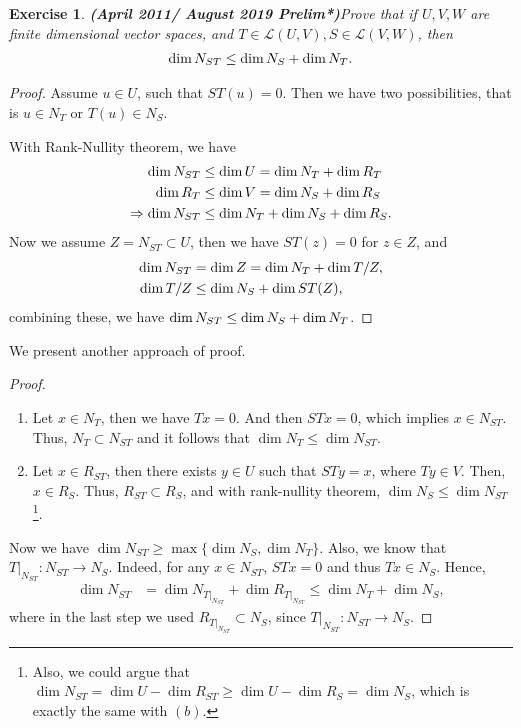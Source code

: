 \documentclass[11pt]{book}
\newtheorem{exercise}{Exercise}[section]
\theoremstyle{definition}
\numberwithin{equation}{subsection}
\begin{document}
\medskip

\begin{exercise}{\bf (April 2011/ August 2019 Prelim*)}\label{April_2011_p1}
Prove that if $U,V,W$ are finite dimensional vector spaces, and $T\in\mathscr{L}(U,V), S\in\mathscr{L}(V,W)$, then
\begin{align*}
    {\rm dim}\, N_{ST} \leq {\rm dim}\, N_S + {\rm dim}\, N_T.
\end{align*}
\end{exercise}
\begin{proof}
Assume $u\in U$, such that $ST(u) = 0$. Then we have two possibilities, that is $u\in N_T$ or $T(u)\in N_S$.

With Rank-Nullity theorem, we have 
\begin{align*}
    {\rm dim}\, N_{ST} & \leq {\rm dim}\, U = {\rm dim}\, N_T + {\rm dim}\, R_T \\
    {\rm dim}\, R_T & \leq {\rm dim}\, V = {\rm dim}\, N_S + {\rm dim}\, R_S\\
    \Rightarrow {\rm dim}\, N_{ST} & \leq {\rm dim}\, N_T + {\rm dim}\, N_S + {\rm dim}\, R_S.
\end{align*}
Now we assume $Z = N_{ST}\subset U$, then we have $ST(z) = 0$  for $z\in Z$, and 
\begin{align*}
    {\rm dim}\, N_{ST} & = {\rm dim}\, Z = {\rm dim}\, N_T + {\rm dim}\, T/Z, \\
    {\rm dim}\, T/Z & \leq {\rm dim}\, N_S + {\rm dim}\, ST(Z),
\end{align*}
combining these, we have ${\rm dim}\, N_{ST} \leq {\rm dim}\, N_S + {\rm dim}\, N_T$.
\end{proof}

We present another approach of proof.

\begin{proof}
~\begin{enumerate}[label=(\alph*)]
    \item Let $x \in N_T$, then we have $Tx = 0$. And then $STx = 0$, which implies $x \in N_{ST}$. Thus, $N_{T} \subset N_{ST}$ and it follows that $\dim N_T \leq \dim N_{ST}$.
    
    \item Let $x \in R_{ST}$, then there exists $y \in U$ such that $STy = x$, where $Ty \in V$. Then, $x \in R_S$. Thus, $R_{ST} \subset R_S$, and with rank-nullity theorem, $\dim N_S \leq \dim N_{ST}$\footnote{Also, we could argue that $\dim N_{ST} = \dim U - \dim R_{ST} \geq \dim U - \dim R_S = \dim N_S$, which is exactly the same with $(b)$\cite{9}.}.
\end{enumerate}
Now we have $\dim N_{ST} \geq \max \{\dim N_S, \dim N_T\}$. Also, we know that $T|_{N_{ST}}: N_{ST} \to N_S$. Indeed, for any $x \in N_{ST}$, $STx = 0$ and thus $Tx \in N_S$. Hence,
\begin{align*}
    \dim N_{ST} & = \dim N_{T|_{N_{ST}}} + \dim R_{T|_{N_{ST}}} \leq \dim N_T + \dim N_S,
\end{align*}
where in the last step we used $R_{T|_{N_{ST}}} \subset N_S$, since $T|_{N_{ST}}: N_{ST} \to N_S$.
\end{proof}
\end{document}
